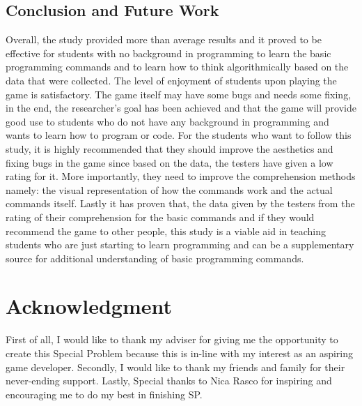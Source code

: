 \documentclass[journal]{./IEEE/IEEEtran}
\newcommand{\tab} [1][0.5cm]{\hspace*{#1}}
\begin{document}
\begin{justify}
\section{\textbf{Conclusion and Future Work}}
Overall, the study provided more than average results and it proved to be effective for students with no background in programming to learn the basic programming commands and to learn how to think algorithmically based on the data that were collected. The level of enjoyment of students upon playing the game is satisfactory. The game itself may have some bugs and needs some fixing, in the end, the researcher’s goal has been achieved and that the game will provide good use to students who do not have any background in programming and wants to learn how to program or code.\newline
\tab	For the students who want to follow this study, it is highly recommended that they should improve the aesthetics and fixing bugs in the game since based on the data, the testers have given a low rating for it. More importantly, they need to improve the comprehension methods namely: the visual representation of how the commands work and the actual commands itself.\newline
\tab	Lastly it has proven that, the data given by the testers from the rating of their comprehension for the basic commands and if they would recommend the game to other people, this study is a viable aid in teaching students who are just starting to learn programming and can be a supplementary source for additional understanding of basic programming commands.
\end{justify}




\section*{\textbf{Acknowledgment}}
First of all, I would like to thank my adviser for giving me the opportunity to create this Special Problem because this is in-line with my interest as an aspiring game developer. Secondly, I would like to thank my friends and family for their never-ending support. Lastly, Special thanks to Nica Rasco for inspiring and encouraging me to do my best in finishing SP.



\nocite{*}

\end{document}
